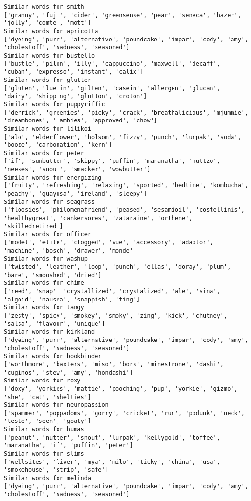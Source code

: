 \documentclass[11pt]{article}
\begin{document}
\begin{Verbatim}[commandchars=\\\{\}]
Similar words for smith
['granny', 'fuji', 'cider', 'greensense', 'pear', 'seneca', 'hazer', 'jolly', 'comte', 'mott']
Similar words for apricotta
['dyeing', 'purr', 'alternative', 'poundcake', 'impar', 'cody', 'amy', 'cholestoff', 'sadness', 'seasoned']
Similar words for bustello
['bustle', 'pilon', 'illy', 'cappuccino', 'maxwell', 'decaff', 'cuban', 'expresso', 'instant', 'calix']
Similar words for glutter
['gluten', 'luetin', 'gilten', 'casein', 'allergen', 'glucan', 'dairy', 'shipping', 'glutton', 'croton']
Similar words for puppyriffic
['derrick', 'greenies', 'picky', 'crack', 'breathalicious', 'mjummie', 'dreambones', 'lambies', 'approved', 'chow']
Similar words for lilikoi
['alo', 'elderflower', 'holsom', 'fizzy', 'punch', 'lurpak', 'soda', 'booze', 'carbonation', 'kern']
Similar words for peter
['if', 'sunbutter', 'skippy', 'puffin', 'maranatha', 'nuttzo', 'neeses', 'snout', 'smacker', 'wowbutter']
Similar words for energizing
['fruity', 'refreshing', 'relaxing', 'sported', 'bedtime', 'kombucha', 'peachy', 'guayusa', 'ireland', 'sleepy']
Similar words for seagrass
['floosies', 'philomenafriend', 'peased', 'sesamioil', 'costellinis', 'healthygreat', 'cankersores', 'zataraine', 'orthene', 'skilledretired']
Similar words for officer
['model', 'elite', 'clogged', 'vue', 'accessory', 'adaptor', 'machine', 'bosch', 'drawer', 'monde']
Similar words for washup
['twisted', 'leather', 'loop', 'punch', 'ellas', 'doray', 'plum', 'bare', 'smooshed', 'dried']
Similar words for chime
['reed', 'snap', 'crystallized', 'crystalized', 'ale', 'sina', 'algoid', 'nausea', 'snappish', 'ting']
Similar words for tangy
['zesty', 'spicy', 'smokey', 'smoky', 'zing', 'kick', 'chutney', 'salsa', 'flavour', 'unique']
Similar words for kirkland
['dyeing', 'purr', 'alternative', 'poundcake', 'impar', 'cody', 'amy', 'cholestoff', 'sadness', 'seasoned']
Similar words for bookbinder
['worthmore', 'baxters', 'miso', 'bors', 'minestrone', 'dashi', 'cuginos', 'stew', 'amy', 'hondashi']
Similar words for roxy
['doxy', 'yorkies', 'mattie', 'pooching', 'pup', 'yorkie', 'gizmo', 'she', 'cat', 'shelties']
Similar words for neuropassion
['spammer', 'poppadoms', 'gorry', 'cricket', 'run', 'podunk', 'neck', 'teste', 'seen', 'goaty']
Similar words for humas
['peanut', 'nutter', 'snout', 'lurpak', 'kellygold', 'toffee', 'maranatha', 'if', 'puffin', 'peter']
Similar words for slims
['wellsites', 'liver', 'mya', 'milo', 'ticky', 'china', 'usa', 'smokehouse', 'strip', 'safe']
Similar words for melinda
['dyeing', 'purr', 'alternative', 'poundcake', 'impar', 'cody', 'amy', 'cholestoff', 'sadness', 'seasoned']

\end{Verbatim}
\end{document}
